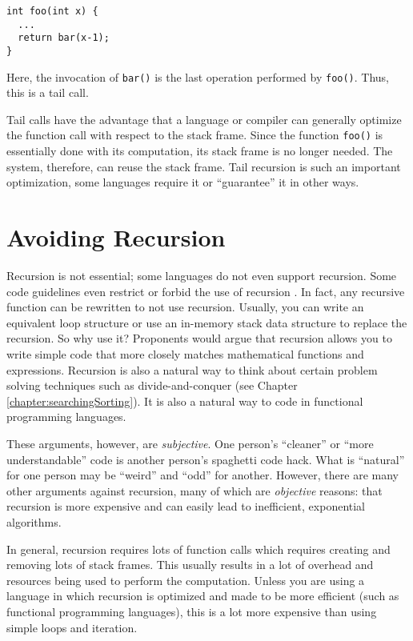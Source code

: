 \begin{verbatim}
int foo(int x) {
  ...
  return bar(x-1);
}
\end{verbatim}

Here, the invocation of \texttt{bar()} is the last operation
performed by \texttt{foo()}.  Thus, this is a tail call.

Tail calls have the advantage that a language or compiler can generally
optimize the function call with respect to the stack frame.  Since the
function \texttt{foo()} is essentially done with its computation, 
its stack frame is no longer needed.  The system, therefore, can reuse
the stack frame.  Tail recursion is such an important optimization, some
languages require it or ``guarantee'' it in other ways.

\section{Avoiding Recursion}

Recursion is not essential; some languages do not even support recursion.
Some code guidelines even restrict or forbid the use of 
recursion \cite{10.1109/MC.2006.212}.
In fact, any recursive function can be rewritten to not use recursion.
Usually, you can write an equivalent loop structure or use an in-memory
\gls{stack} data structure to replace the recursion.
So why use it?  Proponents would argue that recursion allows you to 
write simple code that more closely matches mathematical functions and
expressions.  Recursion is also a natural way to think about certain
problem solving techniques such as divide-and-conquer (see Chapter 
\ref{chapter:searchingSorting}).  It is also a natural way to code
in functional programming languages.

These arguments, however, are \emph{subjective}.  One person's 
``cleaner'' or ``more understandable'' code is another person's 
spaghetti code hack.  What is ``natural'' for one person may be 
``weird'' and ``odd'' for another.  However, there are many other
arguments against recursion, many of which are \emph{objective} 
reasons: that recursion is more expensive and can
easily lead to inefficient, exponential algorithms.

In general, recursion requires lots of function calls which requires 
creating and removing lots of stack frames.  This usually results in 
a lot of overhead and resources being used to perform the computation.  
Unless you are using a language in which recursion is optimized and
made to be more efficient (such as functional programming
languages), this is a lot more expensive than using simple loops and
iteration.  

